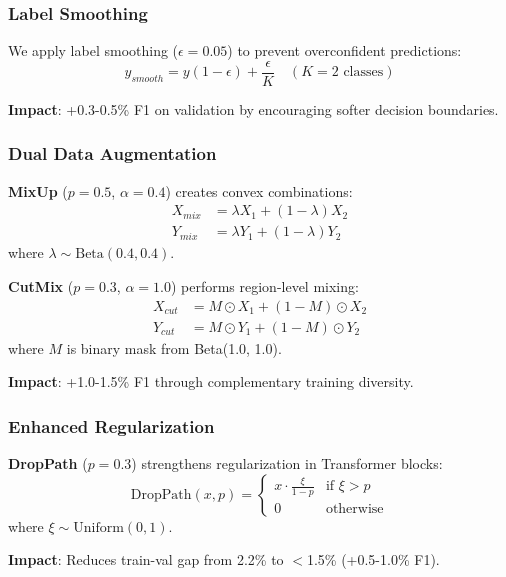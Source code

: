 \documentclass[journal]{IEEEtran}
\begin{document}
\subsubsection{Label Smoothing}

We apply label smoothing ($\epsilon=0.05$) to prevent overconfident predictions:
\begin{equation}
y_{smooth} = y(1-\epsilon) + \frac{\epsilon}{K} \quad (K=2 \text{ classes})
\end{equation}

\textbf{Impact}: +0.3-0.5\% F1 on validation by encouraging softer decision boundaries.

\subsubsection{Dual Data Augmentation}

\textbf{MixUp} ($p=0.5$, $\alpha=0.4$) creates convex combinations:
\begin{align}
X_{mix} &= \lambda X_1 + (1-\lambda) X_2 \\
Y_{mix} &= \lambda Y_1 + (1-\lambda) Y_2
\end{align}
where $\lambda \sim \text{Beta}(0.4, 0.4)$.

\textbf{CutMix} ($p=0.3$, $\alpha=1.0$) performs region-level mixing:
\begin{align}
X_{cut} &= M \odot X_1 + (1-M) \odot X_2 \\
Y_{cut} &= M \odot Y_1 + (1-M) \odot Y_2
\end{align}
where $M$ is binary mask from Beta(1.0, 1.0).

\textbf{Impact}: +1.0-1.5\% F1 through complementary training diversity.

\subsubsection{Enhanced Regularization}

\textbf{DropPath} ($p=0.3$) strengthens regularization in Transformer blocks:
\begin{equation}
\text{DropPath}(x, p) = 
\begin{cases}
x \cdot \frac{\xi}{1-p} & \text{if } \xi > p \\
0 & \text{otherwise}
\end{cases}
\end{equation}
where $\xi \sim \text{Uniform}(0,1)$.

\textbf{Impact}: Reduces train-val gap from 2.2\% to $<$1.5\% (+0.5-1.0\% F1).
\end{document}
